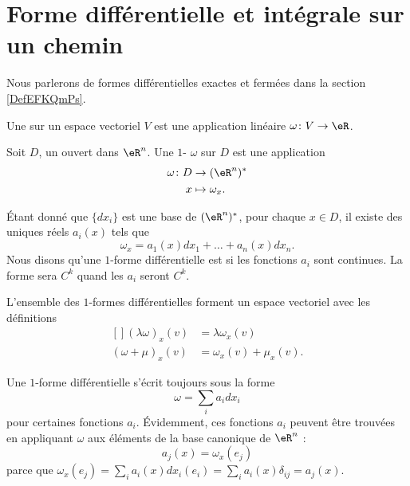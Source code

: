 \section{Forme différentielle et intégrale sur un chemin}
\label{SecFormDiffRappel}

Nous parlerons de formes différentielles exactes et fermées dans la section \ref{DefEFKQmPs}.

Une  sur un espace vectoriel $V$ est une application linéaire $\omega\colon V\to \eR$.

\begin{definition}
	Soit $D$, un ouvert dans $\eR^n$. Une $1$- $\omega$ sur $D$ est une application
	\begin{equation}
		\begin{aligned}
				\omega\colon D&\to (\eR^n)^* \\
				x&\mapsto \omega_x. 
			\end{aligned}
		\end{equation}
\end{definition}
Étant donné que $\{ dx_i \}$ est une base de $(\eR^n)^*$, pour chaque $x\in D$, il existe des uniques réels $a_i(x)$ tels que
\begin{equation}
	\omega_x=a_1(x)dx_1+\ldots+a_n(x)dx_n.
\end{equation}
Nous disons qu'une $1$-forme différentielle est  si les fonctions $a_i$ sont continues. La forme sera $C^k$ quand les $a_i$ seront $C^k$.

\begin{remark}
	L'ensemble des $1$-formes différentielles forment un espace vectoriel avec les définitions
	\begin{equation}
		\begin{aligned}[]
			(\lambda\omega)_x(v)&=\lambda\omega_x(v)\\
			(\omega+\mu)_x(v)&=\omega_x(v)+\mu_x(v).
		\end{aligned}
	\end{equation}
\end{remark}

Une $1$-forme différentielle s'écrit toujours sous la forme
\begin{equation}
	\omega=\sum_i a_idx_i
\end{equation}
pour certaines fonctions $a_i$. Évidemment, ces fonctions $a_i$ peuvent être trouvées en appliquant $\omega$ aux éléments de la base canonique de $\eR^n$ :
\begin{equation}
	a_j(x)=\omega_x(e_j)
\end{equation}
parce que $\omega_x(e_j)=\sum_ia_i(x)dx_i(e_i)=\sum_ia_i(x)\delta_{ij}=a_j(x)$.


